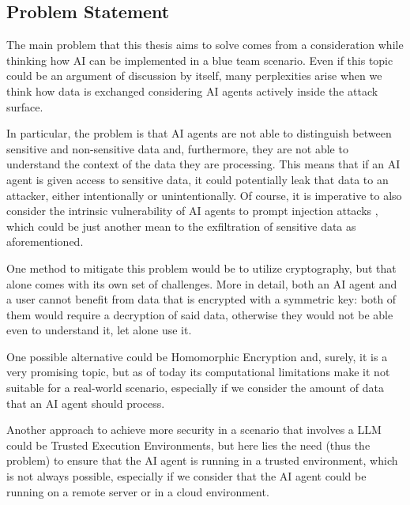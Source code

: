 \subsection{Problem Statement}
The main problem that this thesis aims to solve comes from a consideration while thinking how AI can be implemented in a blue team scenario.
Even if this topic could be an argument of discussion by itself, many perplexities arise when we think how data is exchanged considering AI agents actively inside the attack surface.

In particular, the problem is that AI agents are not able to distinguish between sensitive and non-sensitive data and, furthermore, they are not able to understand the context of the data they are processing. This means that if an AI agent is given access to sensitive data, it could potentially leak that data to an attacker, either intentionally or unintentionally.
Of course, it is imperative to also consider the intrinsic vulnerability of AI agents to prompt injection attacks \cite{debenedetti2025defeating}, which could be just another mean to the exfiltration of sensitive data as aforementioned.

One method to mitigate this problem would be to utilize cryptography, but that alone comes with its own set of challenges. More in detail, both an AI agent and a user cannot benefit from data that is encrypted with a symmetric key: both of them would require a decryption of said  data, otherwise they would not be able even to understand it, let alone use it.

One possible alternative could be Homomorphic Encryption and, surely, it is a very promising topic, but as of today its computational limitations make it not suitable for a real-world scenario, especially if we consider the amount of data that an AI agent should process.

Another approach to achieve more security in a scenario that involves a LLM could be Trusted Execution Environments, but here lies the need (thus the problem) to ensure that the AI agent is running in a trusted environment, which is not always possible, especially if we consider that the AI agent could be running on a remote server or in a cloud environment.


